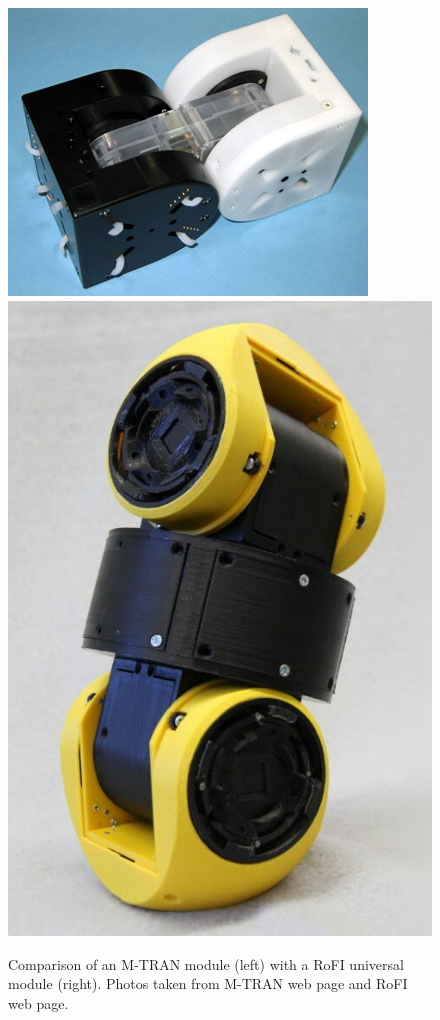 \documentclass[
  printed, %
  color,   %
  notable, %
  oneside, %
  nolof,   %
  nolot,   %
  nocover,
]{fithesis3}
\begin{document}
\begin{figure}
    \centering
    \includegraphics[height=.3\textheight]{data/mtran3.jpg}
    \includegraphics[height=.4\textheight]{data/rofi_universal_module.jpg}
    \caption{Comparison of an M-TRAN module (left) with a RoFI universal module (right). Photos taken from M-TRAN web page\cite{mtran-web} and RoFI web page\cite{rofi-web}.}
    \label{fig:mtran-rofi}
\end{figure}
\end{document}
